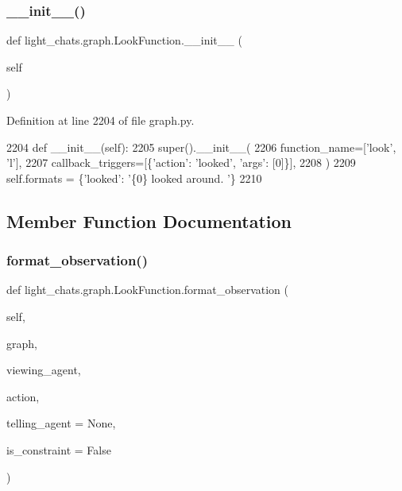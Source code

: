 \subsubsection{\texorpdfstring{\+\_\+\+\_\+init\+\_\+\+\_\+()}{\_\_init\_\_()}}
{\footnotesize\ttfamily def light\+\_\+chats.\+graph.\+Look\+Function.\+\_\+\+\_\+init\+\_\+\+\_\+ (\begin{DoxyParamCaption}\item[{}]{self }\end{DoxyParamCaption})}



Definition at line 2204 of file graph.\+py.


\begin{DoxyCode}
2204     \textcolor{keyword}{def }\_\_init\_\_(self):
2205         super().\_\_init\_\_(
2206             function\_name=[\textcolor{stringliteral}{'look'}, \textcolor{stringliteral}{'l'}],
2207             callback\_triggers=[\{\textcolor{stringliteral}{'action'}: \textcolor{stringliteral}{'looked'}, \textcolor{stringliteral}{'args'}: [0]\}],
2208         )
2209         self.formats = \{\textcolor{stringliteral}{'looked'}: \textcolor{stringliteral}{'\{0\} looked around. '}\}
2210 
\end{DoxyCode}


\subsection{Member Function Documentation}
\mbox{\label{classlight__chats_1_1graph_1_1LookFunction_a7723e1da8ce79443c49fd4a5f6dce978}} 
\subsubsection{\texorpdfstring{format\+\_\+observation()}{format\_observation()}}
{\footnotesize\ttfamily def light\+\_\+chats.\+graph.\+Look\+Function.\+format\+\_\+observation (\begin{DoxyParamCaption}\item[{}]{self,  }\item[{}]{graph,  }\item[{}]{viewing\+\_\+agent,  }\item[{}]{action,  }\item[{}]{telling\+\_\+agent = {\ttfamily None},  }\item[{}]{is\+\_\+constraint = {\ttfamily False} }\end{DoxyParamCaption})}

